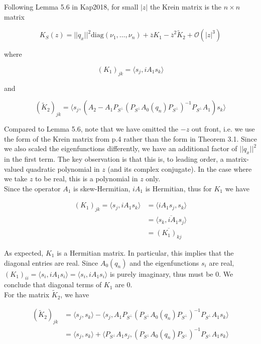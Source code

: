 \documentclass[12pt]{article}
\begin{document}
Following Lemma 5.6 in Kap2018, for small $|z|$ the Krein matrix is the $n \times n$ matrix

\begin{equation}
K_S(z) = ||q_x||^2 \text{diag}(\nu_1, \dots, \nu_n) + \overline{z} K_1 - \overline{z}^2 \tilde{K}_2 + \mathcal{O}(|z|^3)
\end{equation}

where

\begin{equation}
(K_1)_{jk} = \langle s_j, i A_1 s_k \rangle
\end{equation}

and

\begin{equation}
(\tilde{K}_2)_{jk} = \langle s_j, (A_2 - A_1 P_{S^\perp} (P_{S^\perp} A_0(q_n) P_{S^\perp})^{-1} P_{S^\perp} A_1 ) s_k  \rangle
\end{equation}

Compared to Lemma 5.6, note that we have omitted the $-z$ out front, i.e. we use the form of the Krein matrix from p.4 rather than the form in Theorem 3.1. Since we also scaled the eigenfunctions differently, we have an additional factor of $||q_x||^2$ in the first term. The key observation is that this is, to leading order, a matrix-valued quadratic polynomial in $z$ (and its complex conjugate). In the case where we take $z$ to be real, this is a polynomial in $z$ only.\\

Since the operator $A_1$ is skew-Hermitian, $i A_1$ is Hermitian, thus for $K_1$ we have

\begin{align*}
(K_1)_{jk} = \langle s_j, i A_1 s_k \rangle &= \langle i A_1 s_j, s_k \rangle \\
&= \overline{ \langle s_k, i A_1 s_j \rangle } \\
&= \overline{ (K_1)_{kj} }
\end{align*}

As expected, $K_1$ is a Hermitian matrix. In particular, this implies that the diagonal entries are real. Since $A_0(q_n)$ and the eigenfunctions $s_i$ are real, $(K_1)_{ii} = \langle s_i, i A_1 s_i \rangle = \langle s_i, i A_1 s_i \rangle$ is purely imaginary, thus must be 0. We conclude that diagonal terms of $K_1$ are 0.\\

For the matrix $\tilde{K}_2$, we have 

\begin{align*}
(\tilde{K}_2)_{jk} &= \langle s_j, s_k \rangle - \langle s_j, A_1 P_{S^\perp} (P_{S^\perp} A_0(q_n) P_{S^\perp})^{-1} P_{S^\perp} A_1 s_k  \rangle \\
&= \langle s_j, s_k \rangle + \langle P_{S^\perp} A_1 s_j, (P_{S^\perp} A_0(q_n) P_{S^\perp})^{-1} P_{S^\perp} A_1 s_k  \rangle
\end{align*}
\end{document}
